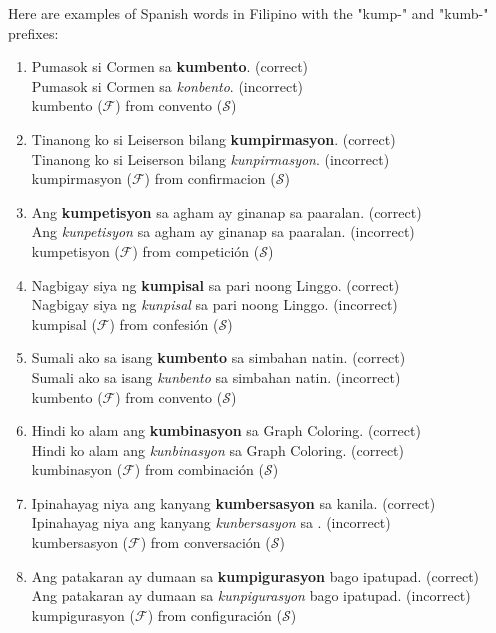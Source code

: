 \begin{example}
    Here are examples of Spanish words in Filipino with the "kump-" and "kumb-"
    prefixes:
\end{example}
\begin{enumerate}
    \item Pumasok si Cormen sa \textbf{kumbento}. (correct) \\
          Pumasok si Cormen sa \textit{konbento}. (incorrect) \\
          kumbento (\(\mathcal{F}\)) from convento (\(\mathcal{S}\))
    \item Tinanong ko si Leiserson bilang \textbf{kumpirmasyon}. (correct) \\
          Tinanong ko si Leiserson bilang \textit{kunpirmasyon}. (incorrect) \\
          kumpirmasyon (\(\mathcal{F}\)) from confirmacion (\(\mathcal{S}\))
    \item Ang \textbf{kumpetisyon} sa agham ay ginanap sa paaralan. (correct) \\
          Ang \textit{kunpetisyon} sa agham ay ginanap sa paaralan. (incorrect) \\
          kumpetisyon (\(\mathcal{F}\)) from competición (\(\mathcal{S}\))
    \item Nagbigay siya ng \textbf{kumpisal} sa pari noong Linggo. (correct) \\
          Nagbigay siya ng \textit{kunpisal} sa pari noong Linggo. (incorrect) \\
          kumpisal (\(\mathcal{F}\)) from confesión (\(\mathcal{S}\))
    \item Sumali ako sa isang \textbf{kumbento} sa simbahan natin. (correct) \\
          Sumali ako sa isang \textit{kunbento} sa simbahan natin. (incorrect) \\
          kumbento (\(\mathcal{F}\)) from convento (\(\mathcal{S}\))
    \item Hindi ko alam ang \textbf{kumbinasyon} sa Graph Coloring. (correct) \\
          Hindi ko alam ang \textit{kunbinasyon} sa Graph Coloring. (correct) \\
          kumbinasyon (\(\mathcal{F}\)) from combinación (\(\mathcal{S}\))
    \item Ipinahayag niya ang kanyang \textbf{kumbersasyon} sa kanila. (correct) \\
          Ipinahayag niya ang kanyang \textit{kunbersasyon} sa . (incorrect) \\
          kumbersasyon (\(\mathcal{F}\)) from conversación (\(\mathcal{S}\))
    \item Ang patakaran ay dumaan sa \textbf{kumpigurasyon} bago ipatupad. (correct) \\
          Ang patakaran ay dumaan sa \textit{kunpigurasyon} bago ipatupad. (incorrect) \\
          kumpigurasyon (\(\mathcal{F}\)) from configuración (\(\mathcal{S}\))
\end{enumerate}

